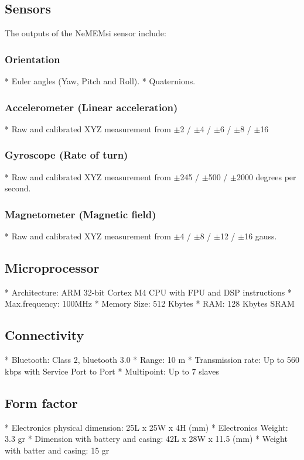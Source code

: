 \subsection*{Sensors}
The outputs of the NeMEMsi sensor include:

\subsubsection*{Orientation}
* Euler angles (Yaw, Pitch and Roll).
* Quaternions.

\subsubsection*{Accelerometer (Linear acceleration)}
* Raw and calibrated XYZ measurement from 
$\pm$2 / $\pm$4 / $\pm$6 / $\pm$8  / $\pm$16

\subsubsection*{Gyroscope (Rate of turn)}
* Raw and calibrated XYZ measurement from 
$\pm$245 /  $\pm$500 / $\pm$2000 degrees per second.

\subsubsection*{Magnetometer (Magnetic field)}
* Raw and calibrated XYZ measurement from 
$\pm$4 / $\pm$8 / $\pm$12 / $\pm$16 gauss.


\subsection*{Microprocessor}
* Architecture: ARM 32-bit Cortex M4 CPU with FPU and DSP instructions
* Max.frequency: 100MHz
* Memory Size: 512 Kbytes
* RAM: 128 Kbytes SRAM


\subsection*{Connectivity}
* Bluetooth: Class 2, bluetooth 3.0
* Range: 10 m
* Transmission rate: Up to 560 kbps with Service Port to Port
* Multipoint: Up to 7 slaves


\subsection*{Form factor}
* Electronics physical dimension: 25L x 25W x 4H (mm)
* Electronics Weight: 3.3 gr
* Dimension with battery and casing: 42L x 28W x 11.5 (mm)
* Weight with batter and casing: 15 gr


